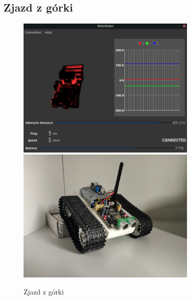 \documentclass[12pt,a4paper,polish]{article}
\begin{document}
  \subsection{Zjazd z górki}
  \begin{figure}[h]
    \centering
    \includegraphics[width=0.77\textwidth]{img/final/3.png}
    \includegraphics[width=0.77\textwidth]{img/final/3e.jpg}
    \caption{Zjazd z górki}
  \end{figure}
\end{document}
